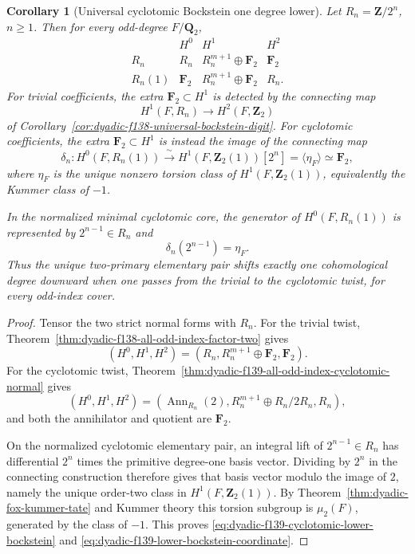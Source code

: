 \documentclass[11pt]{article}
\newtheorem{corollary}[theorem]{Corollary}
\theoremstyle{definition}
\begin{document}
\begin{corollary}[Universal cyclotomic Bockstein one degree lower]
\label{cor:dyadic-f139-cyclotomic-bockstein-shift}
Let $R_n=\mathbf Z/2^n$, $n\ge1$.  Then for every
odd-degree $F/\mathbf Q_2$,
\begin{equation}\label{eq:dyadic-f139-modn-two-twist-ledger}
\boxed{
\begin{array}{c|ccc}
& H^0&H^1&H^2\\ \hline
R_n&
R_n&
R_n^{m+1}\oplus\mathbf F_2&
\mathbf F_2\\
R_n(1)&
\mathbf F_2&
R_n^{m+1}\oplus\mathbf F_2&
R_n .
\end{array}}
\end{equation}
For trivial coefficients, the extra
$\mathbf F_2\subset H^1$ is detected by the
connecting map
\[
H^1(F,R_n)\longrightarrow H^2(F,\mathbf Z_2)
\]
of Corollary~\ref{cor:dyadic-f138-universal-bockstein-digit}.
For cyclotomic coefficients, the extra
$\mathbf F_2\subset H^1$ is instead the image of
the connecting map
\begin{equation}\label{eq:dyadic-f139-cyclotomic-lower-bockstein}
\boxed{
\delta_n:
H^0(F,R_n(1))
\xrightarrow{\ \sim\ }
H^1(F,\mathbf Z_2(1))[2^n]
=\langle\eta_F\rangle\simeq\mathbf F_2,
}
\end{equation}
where $\eta_F$ is the unique nonzero torsion class
of $H^1(F,\mathbf Z_2(1))$, equivalently the
Kummer class of $-1$.

In the normalized minimal cyclotomic core, the
generator of $H^0(F,R_n(1))$ is represented by
$2^{n-1}\in R_n$ and
\begin{equation}\label{eq:dyadic-f139-lower-bockstein-coordinate}
\boxed{\qquad
\delta_n(2^{n-1})=\eta_F.
\qquad}
\end{equation}
Thus the unique two-primary elementary pair shifts
\emph{exactly one cohomological degree downward}
when one passes from the trivial to the cyclotomic
twist, for every odd-index cover.
\end{corollary}

\begin{proof}
Tensor the two strict normal forms with $R_n$.
For the trivial twist,
Theorem~\ref{thm:dyadic-f138-all-odd-index-factor-two}
gives
\[
(H^0,H^1,H^2)
=(R_n,R_n^{m+1}\oplus\mathbf F_2,\mathbf F_2).
\]
For the cyclotomic twist,
Theorem~\ref{thm:dyadic-f139-all-odd-index-cyclotomic-normal}
gives
\[
(H^0,H^1,H^2)
=(\operatorname{Ann}_{R_n}(2),
 R_n^{m+1}\oplus R_n/2R_n,R_n),
\]
and both the annihilator and quotient are
$\mathbf F_2$.

On the normalized cyclotomic elementary pair,
an integral lift of $2^{n-1}\in R_n$ has differential
$2^n$ times the primitive degree-one basis vector.
Dividing by $2^n$ in the connecting construction
therefore gives that basis vector modulo the image
of $2$, namely the unique order-two class in
$H^1(F,\mathbf Z_2(1))$.
By
Theorem~\ref{thm:dyadic-fox-kummer-tate}
and Kummer theory this torsion subgroup is
$\mu_2(F)$, generated by the class of $-1$.
This proves
\eqref{eq:dyadic-f139-cyclotomic-lower-bockstein}
and
\eqref{eq:dyadic-f139-lower-bockstein-coordinate}.
\end{proof}
\end{document}
